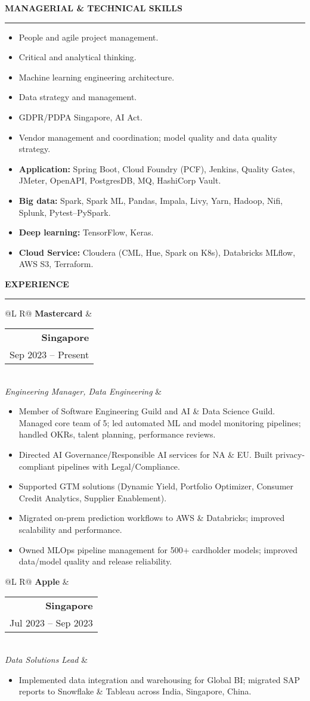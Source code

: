 \documentclass[a4paper,11pt]{article}
\makeatletter
\newcommand{\sectionhr}[1]{%
  \vspace{6pt}\textbf{\MakeUppercase{#1}}\par
  \vspace{2pt}\hrule\vspace{6pt}
}
\newcommand{\rightcol}[2]{\begin{tabular}{@{}r@{}} \textbf{#1}\\ #2 \end{tabular}}
\newcommand{\ExpHeader}[4]{%
  \begin{tabularx}{\linewidth}{@{}L R@{}}
    \textbf{#1} & \rightcol{#3}{#4} \\
    \emph{#2} &
  \end{tabularx}\vspace{2pt}
}
\makeatother
\begin{document}
\sectionhr{Managerial \& Technical Skills}
\begin{itemize}
  \item People and agile project management.
  \item Critical and analytical thinking.
  \item Machine learning engineering architecture.
  \item Data strategy and management.
  \item GDPR/PDPA Singapore, AI Act.
  \item Vendor management and coordination; model quality and data quality strategy.
  \item \textbf{Application:} Spring Boot, Cloud Foundry (PCF), Jenkins, Quality Gates, JMeter, OpenAPI, PostgresDB, MQ, HashiCorp Vault.
  \item \textbf{Big data:} Spark, Spark ML, Pandas, Impala, Livy, Yarn, Hadoop, Nifi, Splunk, Pytest–PySpark.
  \item \textbf{Deep learning:} TensorFlow, Keras.
  \item \textbf{Cloud Service:} Cloudera (CML, Hue, Spark on K8s), Databricks MLflow, AWS S3, Terraform.
\end{itemize}

\sectionhr{Experience}

\ExpHeader
  {Mastercard}
  {Engineering Manager, Data Engineering}
  {Singapore}
  {Sep 2023 -- Present}
\begin{itemize}
  \item Member of Software Engineering Guild and AI \& Data Science Guild. Managed core team of 5; led automated ML and model monitoring pipelines; handled OKRs, talent planning, performance reviews.
  \item Directed AI Governance/Responsible AI services for NA \& EU. Built privacy-compliant pipelines with Legal/Compliance.
  \item Supported GTM solutions (Dynamic Yield, Portfolio Optimizer, Consumer Credit Analytics, Supplier Enablement).
  \item Migrated on-prem prediction workflows to AWS \& Databricks; improved scalability and performance.
  \item Owned MLOps pipeline management for 500+ cardholder models; improved data/model quality and release reliability.
\end{itemize}

\ExpHeader
  {Apple}
  {Data Solutions Lead}
  {Singapore}
  {Jul 2023 -- Sep 2023}
\begin{itemize}
  \item Implemented data integration and warehousing for Global BI; migrated SAP reports to Snowflake \& Tableau across India, Singapore, China.
\end{itemize}
\end{document}
